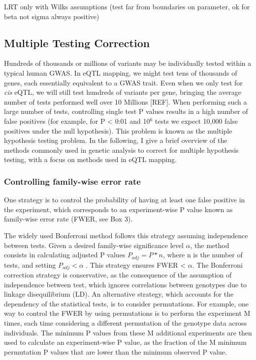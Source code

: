 LRT only with Wilks assumptions (test far from boundaries on parameter, ok for beta not sigma always positive)


\subsection{Multiple Testing Correction}


Hundreds of thousands or millions of variants may be individually tested within a typical human GWAS. 
In eQTL mapping, we might test tens of thousands of genes, each essentially equivalent to a GWAS trait. 
Even when we only test for \textit{cis} eQTL, we will still test hundreds of variants per gene, bringing the average number of tests performed well over 10 Millions [REF].  
When performing such a large number of tests, controlling single test P values results in a high number of false positives (for example, for P < 0:01 and 10$^6$ tests we expect 10,000 false positives under the null hypothesis). 
This problem is known as the multiple hypothesis testing problem. 
In the following, I give a brief overview of the methods commonly used in genetic analysis to correct for multiple hypothesis testing, with a focus on methods used in eQTL mapping.

\subsubsection{Controlling family-wise error rate} 

One strategy is to control the probability of having at least one false positive in the experiment, which corresponds to an experiment-wise P value known as family-wise error rate (FWER, see Box 3).

The widely used Bonferroni method follows this strategy assuming independence between tests. 
Given a desired family-wise significance level $\alpha$, the method consists in calculating adjusted P values $P_{adj} = P*n $, where n is the number of tests, and setting $P_{adj} < \alpha$ . 
This strategy ensures FWER < $\alpha$. 
The Bonferroni correction strategy is conservative, as the consequence of the assumption of independence between test, which ignores correlations between genotypes due to linkage disequilibrium (LD). 
An alternative strategy, which accounts for the dependency of the statistical tests, is to consider permutations. 
For example, one way to control the FWER by using permutations is to perform the experiment M times, each time considering a different permutation of the genotype data across individuals.
The minimum P values from these M additional experiments are then used to calculate an experiment-wise P value, as the fraction of the M minimum permutation P values that are lower than the minimum observed P value. 

